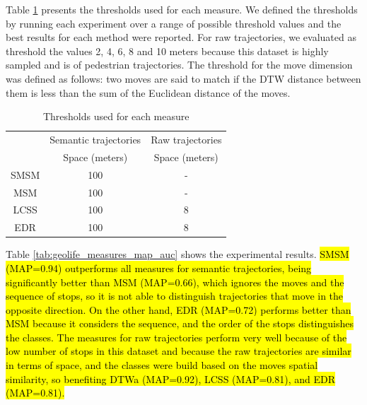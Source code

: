 \documentclass[12pt]{article}
\begin{document}
Table \ref{tab:geolife_thresholds} presents the thresholds used for each measure. We defined the thresholds by running each experiment over a range of possible threshold values and the best results for each method were reported. For raw trajectories, we evaluated as threshold the  values 2, 4, 6, 8 and 10 meters because this dataset is highly sampled and is of pedestrian trajectories. The threshold for the move dimension was defined as follows: two moves are said to match if the DTW distance between them is less than the sum of the Euclidean distance of the moves.

\begin{table}[!h]
\scriptsize
  \centering
  \begin{tabular}{|c|c|c|}
  	\hline
  & \multicolumn{1}{c|}{Semantic trajectories} & \multicolumn{1}{c|}{Raw trajectories} \\
 	\cline{2-3}
  & Space (meters) & Space (meters) \\
  	\hline
 SMSM & 100 & - \\
 MSM & 100 & - \\
 LCSS & 100 & 8 \\
 EDR & 100 & 8 \\
    \hline
  \end{tabular}
  \caption{Thresholds used for each measure}
  \label{tab:geolife_thresholds}
\end{table}

Table \ref{tab:geolife_measures_map_auc} shows the experimental results.  \hl{SMSM (MAP=0.94) outperforms all measures for semantic trajectories, being significantly better than MSM (MAP=0.66), which ignores the moves and the sequence of stops, so it is not able to distinguish trajectories that move in the opposite direction. On the other hand, EDR (MAP=0.72) performs better than MSM because it considers the sequence, and the order of the stops distinguishes the classes. The measures for raw trajectories perform very well because of the low number of stops in this dataset and because the raw trajectories are similar in terms of space, and the classes were build based on the moves spatial similarity, so benefiting DTWa (MAP=0.92), LCSS (MAP=0.81), and EDR (MAP=0.81). }
\end{document}
